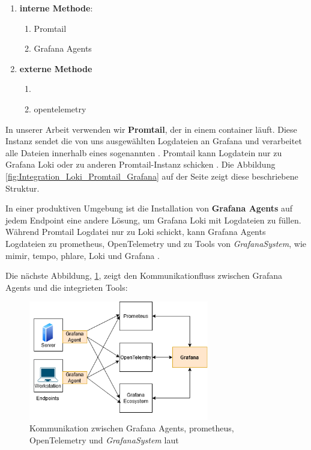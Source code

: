 \begin{enumerate}[noitemsep]
   \item \textbf{interne Methode}:
   \begin{enumerate}[noitemsep]
      \item Promtail
      \item Grafana Agents
   \end{enumerate}
   \item \textbf{externe Methode}
   \begin{enumerate}[noitemsep]
      \item {}
      \item \gls{opentelemetry}
   \end{enumerate}
\end{enumerate}

In unserer Arbeit verwenden wir \textbf{Promtail}, der in einem \gls{container} läuft. Diese Instanz sendet die von uns ausgewählten Logdateien an Grafana und verarbeitet alle Dateien innerhalb eines sogenannten . Promtail kann Logdatein nur zu Grafana Loki oder zu anderen Promtail-Instanz schicken \citep{Grafana_Promtail}. Die Abbildung \ref{fig:Integration_Loki_Promtail_Grafana} auf der Seite \pageref{fig:Integration_Loki_Promtail_Grafana} zeigt diese beschriebene Struktur.

In einer produktiven Umgebung ist die Installation von \textbf{Grafana Agents} auf jedem \gls{Endpoint} eine andere Lösung, um Grafana Loki mit Logdateien zu füllen. Während Promtail Logdatei nur zu Loki schickt, kann Grafana Agents Logdateien zu \gls{prometheus}, OpenTelemetry und zu Tools von \textit{\gls{GrafanaSystem}}, wie \gls{mimir}, \gls{tempo}, \gls{phlare}, Loki und Grafana \citep{Grafana_Agents}.

\newpage
Die nächste Abbildung, \ref{fig:GrafAgents}, zeigt den Kommunikationfluss zwischen Grafana Agents und die integrieten Tools:

\begin{figure}[H]
   \centering
   \includegraphics[width=0.7\textwidth]{assets/GrafanaAgents.drawio.png}
   \caption[Kommunikation zwischen Grafana Agents, \gls{prometheus}, OpenTelemetry und \textit{\gls{GrafanaSystem}}]
   {Kommunikation zwischen Grafana Agents, \gls{prometheus}, OpenTelemetry und \textit{\gls{GrafanaSystem}} laut \cite{Grafana_Agents}}
   \label{fig:GrafAgents}
   \centering
\end{figure}

